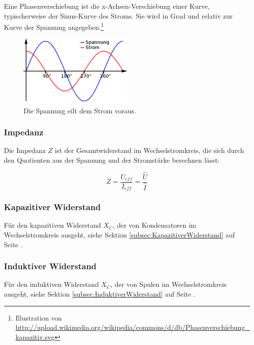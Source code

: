 Eine Phasenverschiebung ist die x-Achsen-Verschiebung einer Kurve, typischerweise der Sinus-Kurve des Stroms. Sie wird in Grad und relativ zur Kurve der Spannung angegeben.\footnote{Illustration von \url{http://upload.wikimedia.org/wikipedia/commons/d/db/Phasenverschiebung_kapazitiv.svg}}

\begin{figure}[h!]
	\centering
	\includegraphics[width=0.5\textwidth]{Pictures/Phasenverschiebung}
	\caption{\glqq Die Spannung eilt dem Strom voraus.\grqq }
\end{figure}


\subsubsection{Impedanz}

Die Impedanz $Z$ ist der Gesamtwiderstand im Wechselstromkreis, die sich durch den Quotienten aus der Spannung und der Stromstärke berechnen lässt:

\begin{equation}		\label{eq:Impedanz}
	Z = \frac{U_{eff}}{I_{eff}}
	  = \frac{\hat{U}}{\hat{I}}
\end{equation}


\subsubsection{Kapazitiver Widerstand}

Für den kapazitiven Widerstand $X_C$, der von Kondensatoren im Wechselstromkreis ausgeht, siehe Sektion \ref{subsec:KapazitiverWiderstand} auf Seite \pageref{subsec:KapazitiverWiderstand}.


\subsubsection{Induktiver Widerstand}

Für den induktiven Widerstand $X_C$, der von Spulen im Wechselstromkreis ausgeht, siehe Sektion \ref{subsec:InduktiverWiderstand} auf Seite \pageref{subsec:InduktiverWiderstand}.






